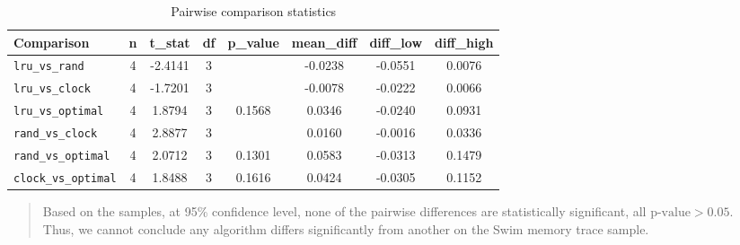 \documentclass[a4paper, 11pt]{report}
\begin{document}
    \begin{table}[ht]
        \centering
        \label{tab:pairwise_3}
        \begin{tabular}{l
                        S[table-format=1.0]
                        S[table-format=-2.4]
                        S[table-format=1.0]
                        S[table-format=1.4]
                        S[table-format=-1.4]
                        S[table-format=-1.4]
                        S[table-format=1.4]}
            \toprule
            {Comparison} & {n} & {t\_stat} & {df} & {p\_value} & {mean\_diff} & {diff\_low} & {diff\_high} \\
            \midrule
            \texttt{lru\_vs\_rand}     & 4 & -2.4141 & 3 &  & -0.0238 & -0.0551 & 0.0076 \\
            \texttt{lru\_vs\_clock}    & 4 & -1.7201 & 3 &  & -0.0078 & -0.0222 & 0.0066 \\
            \texttt{lru\_vs\_optimal}  & 4 &  1.8794 & 3 & 0.1568 &  0.0346 & -0.0240 & 0.0931 \\
            \texttt{rand\_vs\_clock}   & 4 &  2.8877 & 3 &  &  0.0160 & -0.0016 & 0.0336 \\
            \texttt{rand\_vs\_optimal} & 4 &  2.0712 & 3 & 0.1301 &  0.0583 & -0.0313 & 0.1479 \\
            \texttt{clock\_vs\_optimal}& 4 &  1.8488 & 3 & 0.1616 &  0.0424 & -0.0305 & 0.1152 \\
            \bottomrule
        \end{tabular}
        \caption{Pairwise comparison statistics\cite{psu_paired}}
    \end{table}
    \begin{quote}
        Based on the samples, at 95\% confidence level, none of the pairwise differences are statistically significant, all $\text{p-value}>0.05$\cite{psu_paired}.\\
        Thus, we cannot conclude any algorithm differs significantly from another on the Swim memory trace sample.
    \end{quote}
\end{document}
